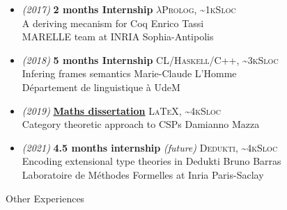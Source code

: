 \documentclass[a4paper,11pt]{extarticle}
\newcommand{\cvtitle}[1]{
    \begin{tcolorbox}[colback=bgcol,colframe=ForestGreen,
        height=1cm, valign=center, sharp corners=downhill]
        {\Large #1}
    \end{tcolorbox}
}
\newcommand{\lang}[2]{\hfill \textsc{\scriptsize #1, \textasciitilde#2Sloc}}
\newcommand{\director}[1]{\hfill {\scriptsize #1}}
\begin{document}
\begin{minipage}[c][282mm][t]{0.60\linewidth}
        \begin{itemize}
          \item \emph{\small (2017)} \textbf{2 months Internship}
                \lang{$\lambda$Prolog}{1k}\\
                A deriving mecanism for Coq
                \director{Enrico Tassi} \\
                MARELLE team at INRIA Sophia-Antipolis
          \item \emph{\small (2018)} \textbf{5 months Internship}
                \lang{CL/Haskell/C++}{3k}\\
                Infering frames semantics
                \director{Marie-Claude L'Homme}\\
                Département de linguistique à UdeM
          \item \emph{\small (2019)} \textbf{\href{https://github.com/dwarfmaster/memoire-dma-l3}{Maths dissertation}}
                \lang{\LaTeX}{4k}\\
                Category theoretic approach to CSPs
                \director{Damianno Mazza}
          \item \emph{\small (2021)} \textbf{4.5 months internship} \emph{(future)}
                \lang{Dedukti}{4k}\\
                Encoding extensional type theories in Dedukti
                \director{Bruno Barras} \\
                Laboratoire de Méthodes Formelles at Inria Paris-Saclay
        \end{itemize}

        \cvtitle{Other Experiences}


\end{minipage}
\end{document}
